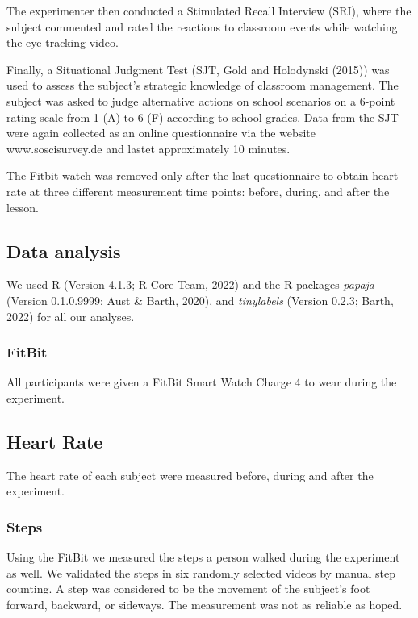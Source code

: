 \documentclass[
  man]{apa6}
\begin{document}
The experimenter then conducted a Stimulated Recall Interview (SRI), where the subject commented and rated the reactions to classroom events while watching the eye tracking video.

Finally, a Situational Judgment Test (SJT, Gold and Holodynski (2015)) was used to assess the subject's strategic knowledge of classroom management. The subject was asked to judge alternative actions on school scenarios on a 6-point rating scale from 1 (A) to 6 (F) according to school grades. Data from the SJT were again collected as an online questionnaire via the website www.soscisurvey.de and lastet approximately 10 minutes.

The Fitbit watch was removed only after the last questionnaire to obtain heart rate at three different measurement time points: before, during, and after the lesson.

\hypertarget{data-analysis}{%
\subsection{Data analysis}\label{data-analysis}}

We used R (Version 4.1.3; R Core Team, 2022) and the R-packages \emph{papaja} (Version 0.1.0.9999; Aust \& Barth, 2020), and \emph{tinylabels} (Version 0.2.3; Barth, 2022) for all our analyses.

\hypertarget{fitbit}{%
\subsubsection{FitBit}\label{fitbit}}

All participants were given a FitBit Smart Watch Charge 4 to wear during the experiment.

\hypertarget{heart-rate}{%
\subsection{Heart Rate}\label{heart-rate}}

The heart rate of each subject were measured before, during and after the experiment.

\hypertarget{steps}{%
\subsubsection{Steps}\label{steps}}

Using the FitBit we measured the steps a person walked during the experiment as well. We validated the steps in six randomly selected videos by manual step counting. A step was considered to be the movement of the subject's foot forward, backward, or sideways. The measurement was not as reliable as hoped.
\end{document}

